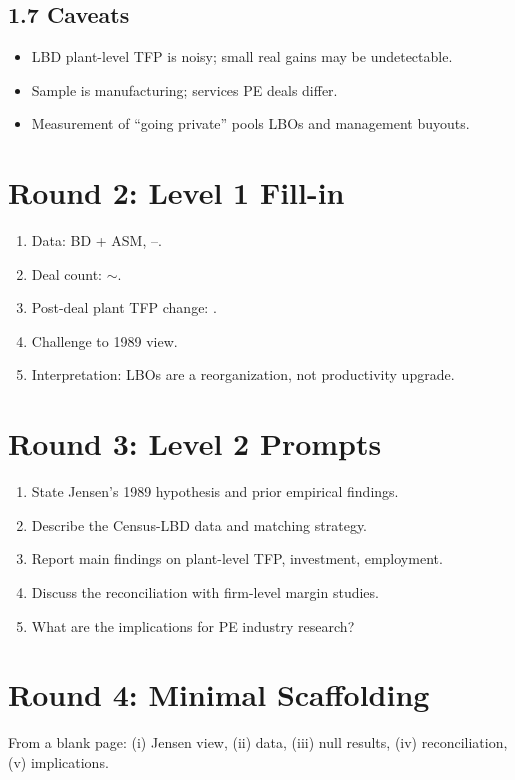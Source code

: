 \documentclass[11pt]{article}
\newcommand{\blank}[1]{\underline{\hspace{#1}}}
\begin{document}
\subsection*{1.7 Caveats}
\begin{alertbox}
\begin{itemize}
\item LBD plant-level TFP is noisy; small real gains may be undetectable.
\item Sample is manufacturing; services PE deals differ.
\item Measurement of ``going private'' pools LBOs and management buyouts.
\end{itemize}
\end{alertbox}

\section*{Round 2: Level 1 Fill-in}
\begin{enumerate}
\item Data: \blank{1cm}BD + ASM, \blank{1cm}--\blank{1cm}.
\item Deal count: $\sim$\blank{1cm}.
\item Post-deal plant TFP change: \blank{2cm}.
\item Challenge to \blank{2cm} 1989 view.
\item Interpretation: LBOs are a \blank{2cm} reorganization, not productivity upgrade.
\end{enumerate}

\section*{Round 3: Level 2 Prompts}
\begin{enumerate}
\item State Jensen's 1989 hypothesis and prior empirical findings.
\item Describe the Census-LBD data and matching strategy.
\item Report main findings on plant-level TFP, investment, employment.
\item Discuss the reconciliation with firm-level margin studies.
\item What are the implications for PE industry research?
\end{enumerate}

\section*{Round 4: Minimal Scaffolding}
From a blank page: (i) Jensen view, (ii) data, (iii) null results, (iv) reconciliation, (v) implications.
\end{document}
